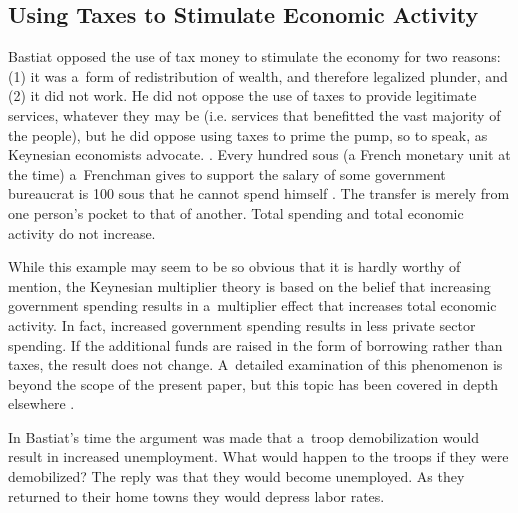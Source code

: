 \subsection{Using Taxes to Stimulate Economic Activity }



Bastiat opposed the use of tax money to stimulate the economy for two reasons: (1) it was a~form of redistribution of wealth, and therefore legalized plunder, and (2) it did not work. He did not oppose the use of taxes to provide legitimate services, whatever they may be (i.e. services that benefitted the vast majority of the people), but he did oppose using taxes to prime the pump, so to speak, as Keynesian economists advocate. 
\parencite[][pp.8–9]{}. %
 Every hundred sous (a French monetary unit at the time) a~Frenchman gives to support the salary of some government bureaucrat is 100 sous that he cannot spend himself 
\parencite[][p.8]{bastiat_selected_1964}. %
 The transfer is merely from one person's pocket to that of another. Total spending and total economic activity do not increase.



While this example may seem to be so obvious that it is hardly worthy of mention, the Keynesian multiplier theory 
\parencite[][]{keynes_general_1936} %
 is based on the belief that increasing government spending results in a~multiplier effect that increases total economic activity. In fact, increased government spending results in less private sector spending. If the additional funds are raised in the form of borrowing rather than taxes, the result does not change. A~detailed examination of this phenomenon is beyond the scope of the present paper, but this topic has been covered in depth elsewhere 
\parencites[][]{ahiakpor_hawtrey_2000}[][]{dimand_hawtrey_1997}[][]{dimand_hawtrey_2000}[][]{hazlitt_economics_1946}[][]{hazlitt_failure_1959}[][]{hazlitt_critics_1960}[][]{hazlitt_economics_1979}[][]{hegeland_multiplier_1954}[][]{hutt_keynesianism--retrospect_1963}[][]{hutt_keynesian_1979}[][]{skousen_dissent_1992}[][]{terborgh_new_1968}.%




In Bastiat's time the argument was made that a~troop demobilization would result in increased unemployment. What would happen to the troops if they were demobilized? The reply was that they would become unemployed. As they returned to their home towns they would depress labor rates.



